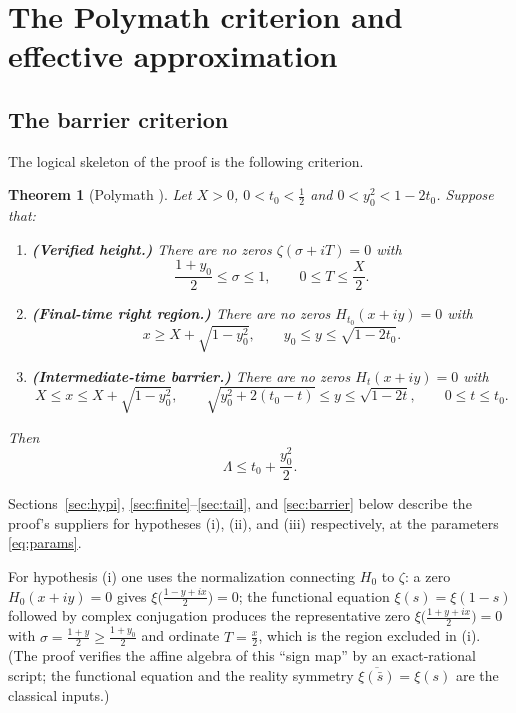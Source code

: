 \documentclass[11pt]{article}
\newtheorem{theorem}{Theorem}[section]
\theoremstyle{definition}
\newcommand{\LB}{\Lambda}
\begin{document}
\section{The Polymath criterion and effective approximation}

\subsection{The barrier criterion}

The logical skeleton of the proof is the following criterion.

\begin{theorem}[{Polymath \cite[Theorem~1.2]{Polymath}}]\label{thm:criterion}
Let $X>0$, $0<t_0<\tfrac12$ and $0<y_0^2<1-2t_0$. Suppose that:
\begin{enumerate}
\item[\textup{(i)}] \textbf{(Verified height.)} There are no zeros
$\zeta(\sigma+iT)=0$ with
\[
\frac{1+y_0}{2}\le\sigma\le1,\qquad 0\le T\le\frac X2 .
\]
\item[\textup{(ii)}] \textbf{(Final-time right region.)} There are no
zeros $H_{t_0}(x+iy)=0$ with
\[
x\ge X+\sqrt{1-y_0^2},\qquad y_0\le y\le\sqrt{1-2t_0}.
\]
\item[\textup{(iii)}] \textbf{(Intermediate-time barrier.)} There are
no zeros $H_t(x+iy)=0$ with
\[
X\le x\le X+\sqrt{1-y_0^2},\qquad
\sqrt{y_0^2+2(t_0-t)}\le y\le\sqrt{1-2t},\qquad
0\le t\le t_0 .
\]
\end{enumerate}
Then
\[
\LB\le t_0+\frac{y_0^2}{2}.
\]
\end{theorem}

Sections~\ref{sec:hypi}, \ref{sec:finite}--\ref{sec:tail}, and
\ref{sec:barrier} below describe the proof's suppliers for
hypotheses (i), (ii), and (iii) respectively, at the parameters
\eqref{eq:params}.

For hypothesis (i) one uses the normalization connecting $H_0$ to
$\zeta$: a zero $H_0(x+iy)=0$ gives
$\xi\bigl(\frac{1-y+ix}{2}\bigr)=0$; the functional equation
$\xi(s)=\xi(1-s)$ followed by complex conjugation produces the
representative zero $\xi\bigl(\frac{1+y+ix}{2}\bigr)=0$ with
$\sigma=\frac{1+y}2\ge\frac{1+y_0}2$ and ordinate $T=\frac x2$, which
is the region excluded in (i). (The proof verifies the affine
algebra of this ``sign map'' by an exact-rational script; the
functional equation and the reality symmetry
$\overline{\xi(\bar s)}=\xi(s)$ are the classical inputs.)
\end{document}
